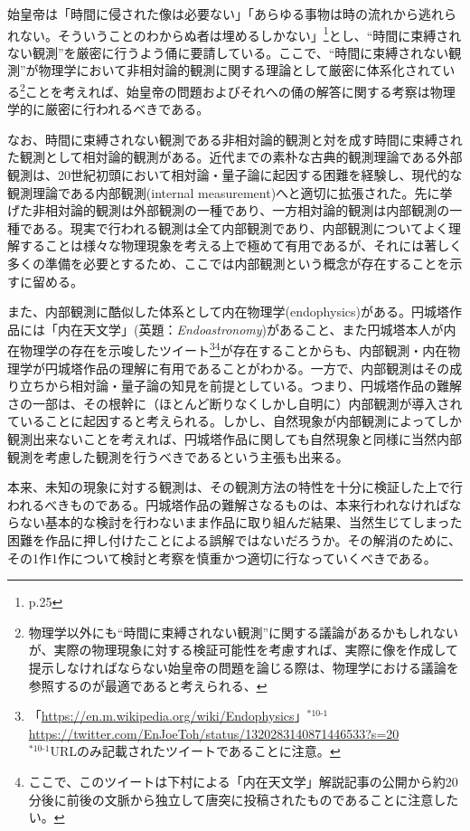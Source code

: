 \documentclass[10pt, a5paper, twoside]{jsarticle}
\theoremstyle{definition}
\begin{document}
			始皇帝は「時間に侵された像は必要ない」「あらゆる事物は時の流れから逃れられない。そういうことのわからぬ者は埋めるしかない」\footnote{\cite{mojika}p.25}とし、“時間に束縛されない観測”を厳密に行うよう俑に要請している\cite{com}。ここで、“時間に束縛されない観測”が物理学において非相対論的観測に関する理論として厳密に体系化されている\footnote{物理学以外にも“時間に束縛されない観測”に関する議論があるかもしれないが、実際の物理現象に対する検証可能性を考慮すれば、実際に像を作成して提示しなければならない始皇帝の問題を論じる際は、物理学における議論を参照するのが最適であると考えられる、}ことを考えれば、始皇帝の問題およびそれへの俑の解答に関する考察は物理学的に厳密に行われるべきである。

			なお、時間に束縛されない観測である非相対論的観測と対を成す時間に束縛された観測として相対論的観測がある。近代までの素朴な古典的観測理論である外部観測は、20世紀初頭において相対論・量子論に起因する困難を経験し、現代的な観測理論である内部観測(internal measurement)へと適切に拡張された。先に挙げた非相対論的観測は外部観測の一種であり、一方相対論的観測は内部観測の一種である。現実で行われる観測は全て内部観測であり、内部観測についてよく理解することは様々な物理現象を考える上で極めて有用であるが、それには著しく多くの準備を必要とするため、ここでは内部観測という概念が存在することを示すに留める。

			また、内部観測に酷似した体系として内在物理学(endophysics)がある。円城塔作品には「内在天文学」(英題：\textit{Endoastronomy})があること、また円城塔本人が内在物理学の存在を示唆したツイート\footnote{「\url{https://en.m.wikipedia.org/wiki/Endophysics}」$^{*10\text{-}1}$\url{https://twitter.com/EnJoeToh/status/1320283140871446533?s=20}\\$^{*10\text{-}1}$URLのみ記載されたツイートであることに注意。}\footnote{ここで、このツイートは下村による「内在天文学」解説記事\cite{endo}の公開から約20分後に前後の文脈から独立して唐突に投稿されたものであることに注意したい。}が存在することからも、内部観測・内在物理学が円城塔作品の理解に有用であることがわかる。一方で、内部観測はその成り立ちから相対論・量子論の知見を前提としている。つまり、円城塔作品の難解さの一部は、その根幹に（ほとんど断りなくしかし自明に）内部観測が導入されていることに起因すると考えられる。しかし、自然現象が内部観測によってしか観測出来ないことを考えれば、円城塔作品に関しても自然現象と同様に当然内部観測を考慮した観測を行うべきであるという主張も出来る。

			本来、未知の現象に対する観測は、その観測方法の特性を十分に検証した上で行われるべきものである。円城塔作品の難解さなるものは、本来行われなければならない基本的な検討を行わないまま作品に取り組んだ結果、当然生じてしまった困難を作品に押し付けたことによる誤解ではないだろうか。その解消のために、その1作1作について検討と考察を慎重かつ適切に行なっていくべきである。
\end{document}
